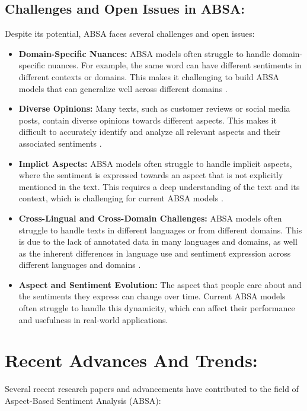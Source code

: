 \documentclass{article}
\begin{document}
\subsection{Challenges and Open Issues in ABSA: }
Despite its potential, ABSA faces several challenges and open issues: 
\begin{itemize}
    \item \textbf{Domain-Specific Nuances: } ABSA models often struggle to handle domain-specific nuances. For example, the same word can have different sentiments in different contexts or domains. This makes it challenging to build ABSA models that can generalize well across different domains \cite{NazirIssues&Chall2023}\cite{doi:10.1504/IJESMS.2021.119892}.
    \item \textbf{Diverse Opinions: } Many texts, such as customer reviews or social media posts, contain diverse opinions towards different aspects. This makes it difficult to accurately identify and analyze all relevant aspects and their associated sentiments \cite{NazirIssues&Chall2023}.
    \item \textbf{Implict Aspects: } ABSA models often struggle to handle implicit aspects, where the sentiment is expressed towards an aspect that is not explicitly mentioned in the text. This requires a deep understanding of the text and its context, which is challenging for current ABSA models \cite{NazirIssues&Chall2023}.
    \item \textbf{Cross-Lingual and Cross-Domain Challenges: } ABSA models often struggle to handle texts in different languages or from different domains. This is due to the lack of annotated data in many languages and domains, as well as the inherent differences in language use and sentiment expression across different languages and domains \cite{Verma2022ASO}.
    \item \textbf{Aspect and Sentiment Evolution: } The aspect that people care about and the sentiments they express can change over time. Current ABSA models often struggle to handle this dynamicity, which can affect their performance and usefulness in real-world applications\cite{NazirIssues&Chall2023}.
    
\end{itemize}

\section{Recent Advances And Trends: }
Several recent research papers and advancements have contributed to the field of Aspect-Based Sentiment Analysis (ABSA):
\end{document}

